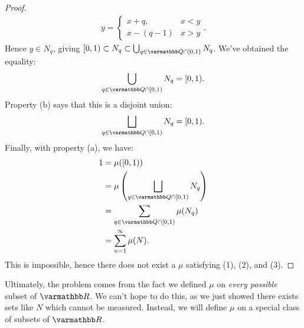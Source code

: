 \begin{proof}
                \begin{equation*}
                \begin{split}
                    y =
                    \begin{cases}
                        x+q, & x < y \\
                        x - (q-1) & x > y
                    \end{cases}.
                \end{split}
                \end{equation*}
            Hence $y \in N_q$, giving $[0,1) \subset N_q \subset \bigcup_{q \in \bfQ \cap [0,1)}N_q$. We've obtained the equality:
                \begin{equation*}
                \begin{split}
                    \bigcup_{q \in \bfQ \cap [0,1)}N_q = [0,1).
                \end{split}
                \end{equation*}
            Property (b) says that this is a disjoint union:
                \begin{equation*}
                \begin{split}
                    \bigsqcup_{q \in \bfQ \cap [0,1)}N_q = [0,1).
                \end{split}
                \end{equation*}
            Finally, with property (a), we have:
                \begin{equation*}
                \begin{split}
                    1
                    & = \mu([0,1)) \\
                    & = \mu \left( \bigsqcup_{q \in \bfQ \cap [0,1)}N_q \right) \\
                    & = \sum_{q \in \bfQ \cap [0,1)}\mu(N_q) \\
                    & = \sum_{n = 1}^\infty \mu(N).
                \end{split}
                \end{equation*}
            This is impossible, hence there does not exist a $\mu$ satisfying (1), (2), and (3).
        \end{proof}

    Ultimately, the problem comes from the fact we defined $\mu$ on \textit{every possible} subset of $\bfR$. We can't hope to do this, as we just showed there exists sets like $N$ which cannot be measured. Instead, we will define $\mu$ on a special class of subsets of $\bfR$.

